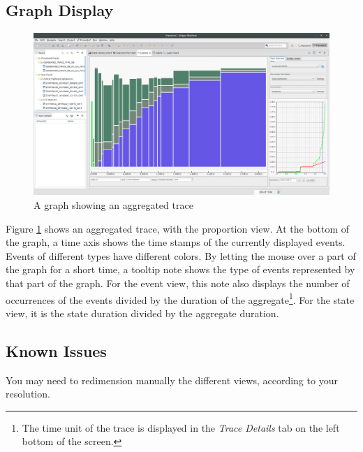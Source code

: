 \documentclass[twoside]{article}
\begin{document}
\begin{sloppypar}
\subsection{Graph Display}
\begin{figure}[h!]
	\centering
	\includegraphics[width=1.0\textwidth]{images/ocelotl_aggregated.png}
	\caption{A graph showing an aggregated trace}
	\label{showAggreg}
\end{figure}

Figure \ref{showAggreg} shows an aggregated trace, with the proportion view. At the bottom of the graph, a time axis shows the time stamps of the currently displayed events. Events of different types have different colors. By letting the mouse over a part of the graph for a short time, a tooltip note shows the type of events represented by that part of the graph. For the event view, this note also displays the number of occurrences of the events divided by the duration of the aggregate\footnote{The time unit of the trace is displayed in the \textit{Trace Details} tab on the left bottom of the screen.}. For the state view, it is the state duration divided by the aggregate duration.

\subsection{Known Issues}
You may need to redimension manually the different views, according to your resolution.

\newpage

\newpage

{}

\end{sloppypar} 
\end{document}

